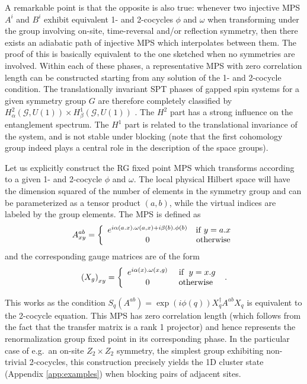 \documentclass[rmp,aps,reprint,superscriptaddress,nobalancelastpage]{revtex4-1}
\begin{document}
A remarkable point is that the opposite is also true: whenever two injective MPS $A^i$ and $B^i$ exhibit equivalent 1- and 2-cocycles $\phi$ and $\omega$ when transforming under the group involving on-site, time-reversal and/or reflection symmetry, then there exists an adiabatic path of injective MPS which interpolates between them. The proof of this is basically equivalent to the one sketched when no symmetries are involved.  Within each of these phases, a representative MPS with zero correlation length can be constructed starting from any solution of the 1- and 2-cocycle condition. The translationally invariant SPT phases of gapped spin systems for a given symmetry group $G$ are therefore completely classified by $H^2_\alpha(\mathcal{G},U(1))\times H^1_\beta(\mathcal{G},U(1))$  \cite{chen:spt-order-and-cohomology}. The $H^2$ part has a strong influence on the entanglement spectrum. The $H^1$ part is related to the translational invariance of the system, and is not stable under blocking (note that the first cohomology group indeed plays a central role in the description of the space groups).

Let us explicitly construct the RG fixed point MPS which transforms according to a given 1- and 2-cocycle $\phi$ and $\omega$. The local physical Hilbert space will have the dimension squared of the number of elements in the symmetry group and can be parameterized as a tensor product $(a,b)$, while the virtual indices are labeled by the group elements. The MPS is defined as
\[ A^{ab}_{xy}=\left\{\begin{array}{cc} e^{i\alpha(a.x).\omega(a,x)+i\beta(b).\phi(b)}& {\rm if }\hspace{.1cm} y=a.x\\ 0 & {\rm otherwise}   \end{array}\right.\]
and the corresponding gauge matrices are of the form
\[
    \left(X_g\right)_{xy}=\left\{\begin{array}{cc} e^{i\alpha(x).\omega(x,g)} & \mbox{\ if\ }\hspace{.1cm} y=x.g \\ 0 &
             \mbox{otherwise}\end{array}\right.\ .
\]

This works as the condition $S_q(A^{ab})=\exp(i\phi(q))X_q^\dagger A^{ab} X_q$ is equivalent to the 2-cocycle equation. This MPS has zero correlation length (which follows from the fact that the transfer matrix is a rank 1 projector) and hence represents the renormalization group fixed point in its corresponding phase.  In the particular case of e.g.\ an on-site $Z_2\times Z_2$ symmetry, the simplest group exhibiting non-trivial 2-cocycles, this construction precisely yields the 1D cluster state (Appendix \ref{app:examples}) when blocking pairs of adjacent sites.
\end{document}
